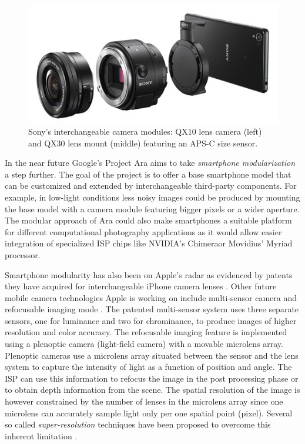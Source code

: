 \documentclass[thesis.tex]{subfiles}
\begin{document}
\begin{figure}[h]
\centering \includegraphics[width=\textwidth]{images/sony_qx.jpg}
\caption{Sony's interchangeable camera modules: QX10 lens camera (left) and QX30 lens mount (middle) featuring an APS-C size sensor.\label{figure:sony-qx} \cite{sony_qx}}
\end{figure}

In the near future Google's Project Ara aims to take \textit{smartphone modularization} a step further. The goal of the project is to offer a base smartphone model that can be customized and extended by interchangeable third-party components. For example, in low-light conditions less noisy images could be produced by mounting the base model with a camera module featuring bigger pixels or a wider aperture. The modular approach of Ara could also make smartphones a suitable platform for different computational photography applications as it would allow easier integration of specialized ISP chips like NVIDIA's Chimera\texttrademark or Movidius' Myriad processor.

Smartphone modularity has also been on Apple's radar as evidenced by patents they have acquired for interchangeable iPhone camera lenses \cite{apple_patent_camera_module_3}\cite{apple_patent_camera_module_4}\cite{apple_patent_camera_module_5}. Other future mobile camera technologies Apple is working on include multi-sensor camera and refocusable imaging mode \cite{apple_patent_camera_module_1}\cite{apple_patent_camera_module_2}. The patented multi-sensor system uses three separate sensors, one for luminance and two for chrominance, to produce images of higher resolution and color accuracy. The refocusable imaging feature is implemented using a plenoptic camera (light-field camera) with a movable microlens array. Plenoptic cameras use a microlens array situated between the sensor and the lens system to capture the intensity of light as a function of position and angle. The ISP can use this information to refocus the image in the post processing phase or to obtain depth information from the scene. The spatial resolution of the image is however constrained by the number of lenses in the microlens array since one microlens can accurately sample light only per one spatial point (pixel). Several so called \textit{super-resolution} techniques have been proposed to overcome this inherent limitation \cite{plenoptic_1}\cite{plenoptic_2}\cite{plenoptic_3}.
\end{document}

